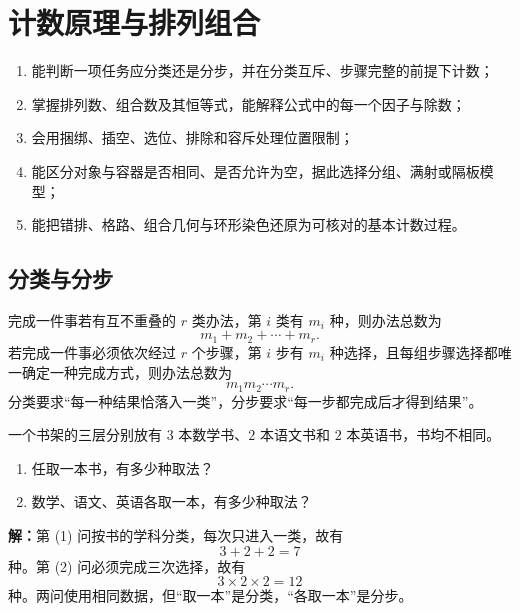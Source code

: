 \chapter{计数原理与排列组合}
\label{chap:counting-principles}

\begin{learninggoals}
  \begin{enumerate}
    \item 能判断一项任务应分类还是分步，并在分类互斥、步骤完整的前提下计数；
    \item 掌握排列数、组合数及其恒等式，能解释公式中的每一个因子与除数；
    \item 会用捆绑、插空、选位、排除和容斥处理位置限制；
    \item 能区分对象与容器是否相同、是否允许为空，据此选择分组、满射或隔板模型；
    \item 能把错排、格路、组合几何与环形染色还原为可核对的基本计数过程。
  \end{enumerate}
\end{learninggoals}

\section{分类与分步}

\begin{lawbox}[分类加法与分步乘法]
  完成一件事若有互不重叠的 $r$ 类办法，第 $i$ 类有 $m_i$ 种，则办法总数为
  \[
    m_1+m_2+\cdots+m_r.
  \]
  若完成一件事必须依次经过 $r$ 个步骤，第 $i$ 步有 $m_i$ 种选择，且每组步骤选择都唯一确定一种完成方式，则办法总数为
  \[
    m_1m_2\cdots m_r.
  \]
  分类要求“每一种结果恰落入一类”，分步要求“每一步都完成后才得到结果”。
\end{lawbox}

\begin{examplebox}
  一个书架的三层分别放有 $3$ 本数学书、$2$ 本语文书和 $2$ 本英语书，书均不相同。
  \begin{enumerate}
    \item 任取一本书，有多少种取法？
    \item 数学、语文、英语各取一本，有多少种取法？
  \end{enumerate}

  \textbf{解：}第 (1) 问按书的学科分类，每次只进入一类，故有
  \[
    3+2+2=7
  \]
  种。第 (2) 问必须完成三次选择，故有
  \[
    3\times2\times2=12
  \]
  种。两问使用相同数据，但“取一本”是分类，“各取一本”是分步。
\end{examplebox}

